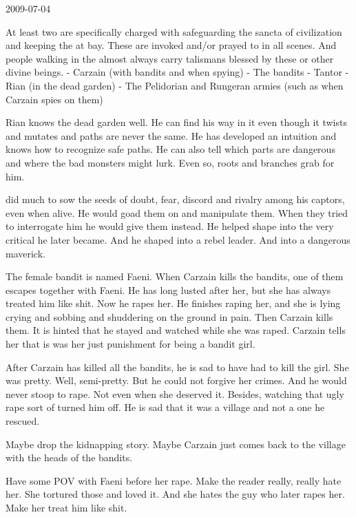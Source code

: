 2009-07-04

At least two \sephiroth are specifically charged with safeguarding the sancta of civilization and keeping the \wylde at bay.
These are invoked and/or prayed to in all \wylde scenes.
And people walking in the \wylde almost always carry \wylde talismans blessed by these \sephiroth or other divine beings.
- Carzain (with bandits and when spying)
- The bandits
- Tantor
- Rian (in the dead garden)
- The Pelidorian and Rungeran armies (such as when Carzain spies on them)

Rian knows the dead garden well.
He can find his way in it even though it twists and mutates and paths are never the same.
He has developed an intuition and knows how to recognize safe paths.
He can also tell which parts are dangerous and where the bad monsters might lurk.
Even so, roots and branches grab for him.

\Nexagglachel did much to sow the seeds of doubt, fear, discord and rivalry among his \resphan captors, even when alive.
He would goad them on and manipulate them.
When they tried to interrogate him he would give them  instead.
He helped shape \Azraid into the very critical \resphan he later became.
And he shaped \Sithiyacaan into a rebel leader.
And \Shiaraid into a dangerous maverick.

The female bandit is named Faeni.
When Carzain kills the bandits, one of them escapes together with Faeni.
He has long lusted after her, but she has always treated him like shit.
Now he rapes her.
He finishes raping her, and she is lying crying and sobbing and shuddering on the ground in pain.
Then Carzain kills them.
It is hinted that he stayed and watched while she was raped.
Carzain tells her that is was her just punishment for being a bandit girl.

After Carzain has killed all the bandits, he is sad to have had to kill the girl.
She was pretty.
Well, semi-pretty.
But he could not forgive her crimes.
And he would never stoop to rape.
Not even when she deserved it.
Besides, watching that ugly rape sort of turned him off.
He is sad that it was a \scatha village and not a \human one he rescued.

Maybe drop the kidnapping story.
Maybe Carzain just comes back to the village with the heads of the bandits.

Have some POV with Faeni before her rape.
Make the reader really, really hate her.
She tortured those \scathae and loved it.
And she hates the guy who later rapes her.
Make her treat him like shit.


